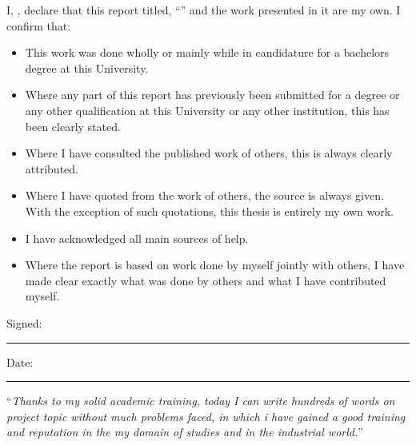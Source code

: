 \documentclass[
11pt, %
english, %
singlespacing, %
headsepline, %
]{InternshipReport} %
\begin{document}

\begin{declaration}
\addchaptertocentry{\authorshipname}

\noindent I, \authorname, declare that this report titled, \enquote{\ttitle} and the work presented in it are my own. I confirm that:

\begin{itemize} 
\item This work was done wholly or mainly while in candidature for a bachelors degree at this University.
\item Where any part of this report has previously been submitted for a degree or any other qualification at this University or any other institution, this has been clearly stated.
\item Where I have consulted the published work of others, this is always clearly attributed.
\item Where I have quoted from the work of others, the source is always given. With the exception of such quotations, this thesis is entirely my own work.
\item I have acknowledged all main sources of help.
\item Where the report is based on work done by myself jointly with others, I have made clear exactly what was done by others and what I have contributed myself.\\
\end{itemize}
 
\noindent Signed:\\
\rule[0.5em]{25em}{0.5pt} %
 
\noindent Date:\\
\rule[0.5em]{25em}{0.5pt} %
\end{declaration}

\cleardoublepage


\vspace*{0.2\textheight}

\noindent\enquote{\itshape Thanks to my solid academic training, today I can write hundreds of words on project topic without much problems faced, in which i have gained a good training and reputation in the my domain of studies and in the industrial world.}\bigbreak
\end{document}
